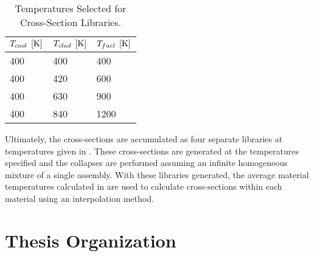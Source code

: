     \begin{table}
      \caption{Temperatures Selected for Cross-Section Libraries.}
      \label{tab:xstemps}
      \begin{center}
        \begin{tabular}{lll}
          \toprule
          $T_{cool} \;\left[\text{{K}}\right]$ & $T_{clad} \;\left[\text{{K}}\right]$ & $T_{fuel} \;\left[\text{{K}}\right]$ \\
          \midrule
          400 & 400 & 400  \\
          400 & 420 & 600  \\
          400 & 630 & 900  \\
          400 & 840 & 1200 \\
          \bottomrule
        \end{tabular}
      \end{center}
    \end{table}

    Ultimately, the cross-sections are accumulated as four separate libraries at
    temperatures given in . These cross-sections are generated
    at the temperatures specified and the collapses are performed assuming an
    infinite homogeneous mixture of a single assembly. With these libraries
    generated, the average material temperatures calculated in 
     are used to calculate cross-sections within each
    material using an interpolation method.

\section{Thesis Organization}
